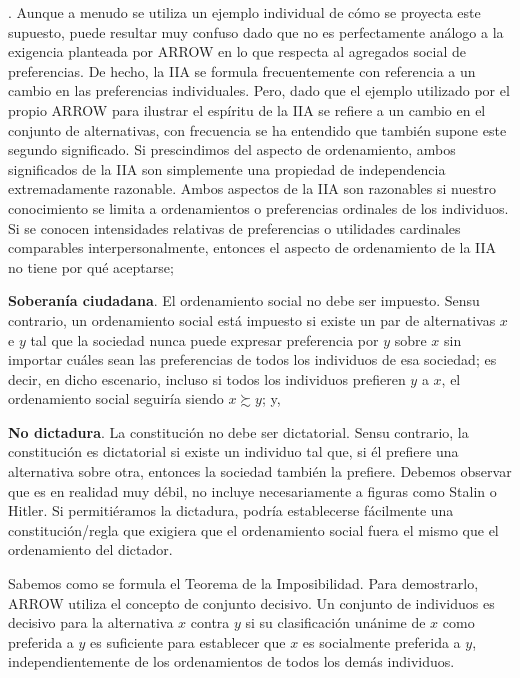 \documentclass[10pt,a4paper]{article}
\newcounter{numitem}
\newenvironment{lnum}
      {\begin{list}{\arabic{numitem}.}{%
          \usecounter{numitem}%
          \setlength{\leftmargin}{1cm}%
          \setlength{\parskip}{3pt}%
          \setlength{\itemsep}{0pt}%
          \setlength{\parsep}{0pt}%
      }}
      {\end{list}}
\begin{document}
\begin{lnum}
{    Aunque a menudo se utiliza un ejemplo individual de cómo se proyecta este supuesto, puede resultar muy confuso dado que no es perfectamente análogo a la exigencia planteada por ARROW en lo que respecta al agregados social de preferencias. De hecho, la IIA se formula frecuentemente con referencia a un cambio en las preferencias individuales. Pero, dado que el ejemplo utilizado por el propio ARROW para ilustrar el espíritu de la IIA se refiere a un cambio en el conjunto de alternativas, con frecuencia se ha entendido que también supone este segundo significado. Si prescindimos del aspecto de ordenamiento, ambos significados de la IIA son simplemente una propiedad de independencia extremadamente razonable.
    } Ambos aspectos de la IIA son razonables si nuestro conocimiento se limita a ordenamientos o preferencias ordinales de los individuos. Si se conocen intensidades relativas de preferencias o utilidades cardinales comparables interpersonalmente, entonces el aspecto de ordenamiento de la IIA no tiene por qué aceptarse;
    \item \textbf{Soberanía ciudadana}. El ordenamiento social no debe ser impuesto. Sensu contrario, un ordenamiento social está impuesto si existe un par de alternativas $x$ e $y$ tal que la sociedad nunca puede expresar preferencia por $y$ sobre $x$ sin importar cuáles sean las preferencias de todos los individuos de esa sociedad; es decir, en dicho escenario, incluso si todos los individuos prefieren $y$ a $x$, el ordenamiento social seguiría siendo $x\succsim y$; y,
    \item \textbf{No dictadura}. La constitución no debe ser dictatorial. Sensu contrario, la constitución es dictatorial si existe un individuo tal que, si él prefiere una alternativa sobre otra, entonces la sociedad también la prefiere. Debemos observar que es en realidad muy débil, no incluye necesariamente a figuras como Stalin o Hitler. Si permitiéramos la dictadura, podría establecerse fácilmente una constitución/regla que exigiera que el ordenamiento social fuera el mismo que el ordenamiento del dictador.
\end{lnum}

Sabemos como se formula el Teorema de la Imposibilidad. Para demostrarlo, ARROW utiliza el concepto de conjunto decisivo. Un conjunto de individuos es decisivo para la alternativa $x$ contra $y$ si su clasificación unánime de $x$ como preferida a $y$ es suficiente para establecer que $x$ es socialmente preferida a $y$, independientemente de los ordenamientos de todos los demás individuos.
\end{document}
